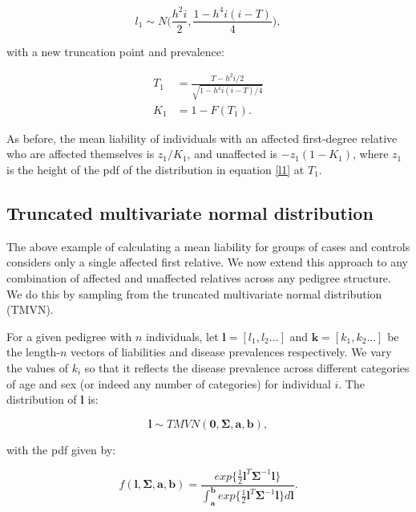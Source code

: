 \documentclass{article}
\begin{document}
\begin{equation}
\label{l1}
l_1 \sim N\bigg( \frac{h^2i}{2}, \frac{1-h^4i(i-T)}{4}\bigg),
\end{equation}

\noindent with a new truncation point and prevalence:

\begin{align}
T_1 &= \frac{T-h^2i/2}{\sqrt{1-h^4i(i-T)/4}} \\
K_1 &= 1-F(T_1).
\end{align}

\noindent As before, the mean liability of individuals with an affected first-degree relative who are affected themselves is $z_1/K_1$, and unaffected is $-z_1(1-K_1)$, where $z_1$ is the height of the pdf of the distribution in equation \ref{l1} at $T_1$.

\subsection{Truncated multivariate normal distribution}
The above example of calculating a mean liability for groups of cases and controls considers only a single affected first relative. We now extend this approach to any combination of affected and unaffected relatives across any pedigree structure. We do this by sampling from the truncated multivariate normal distribution (TMVN).

For a given pedigree with $n$ individuals, let $\boldsymbol{l} = [l_1,l_2...]$ and $\boldsymbol{k} = [k_1,k_2...]$ be the length-$n$ vectors of liabilities and disease prevalences respectively. We vary the values of $k_i$ so that it reflects the disease prevalence across different categories of age and sex (or indeed any number of categories) for individual $i$. The distribution of $\boldsymbol{l}$ is:

\begin{equation}
\boldsymbol{l} \sim TMVN(\boldsymbol{0},\boldsymbol{\Sigma},\boldsymbol{a},\boldsymbol{b}),
\end{equation}

\noindent with the pdf given by:

\begin{equation}
\label{tmv_pdf}
f(\boldsymbol{l},\boldsymbol{\Sigma},\boldsymbol{a},\boldsymbol{b}) = \frac{exp \big\{ \frac{1}{2} \boldsymbol{l}^T \boldsymbol{\Sigma}^{-1} \boldsymbol{l} \big\}}
{\int_{\boldsymbol{a}}^{\boldsymbol{b}} exp \big\{ \frac{1}{2} \boldsymbol{l}^T \boldsymbol{\Sigma}^{-1} \boldsymbol{l} \big\} d\boldsymbol{l}}.
\end{equation}
\end{document}
